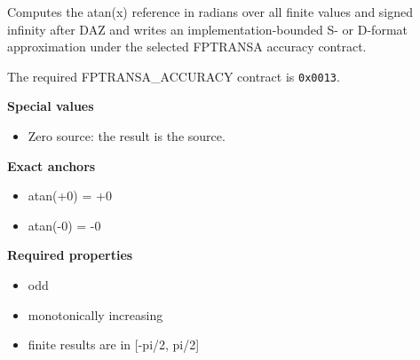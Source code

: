 Computes the atan(x) reference in radians over all finite values and signed infinity after DAZ and writes an implementation-bounded S- or D-format approximation under the selected FPTRANSA accuracy contract.

The required FPTRANSA\_ACCURACY contract is \texttt{0x0013}.

\textbf{Special values}\par
\begin{itemize}
\item Zero source: the result is the source.
\end{itemize}

\textbf{Exact anchors}\par
\begin{itemize}
\item atan(+0) = +0
\item atan(-0) = -0
\end{itemize}

\textbf{Required properties}\par
\begin{itemize}
\item odd
\item monotonically increasing
\item finite results are in [-pi/2, pi/2]
\end{itemize}
